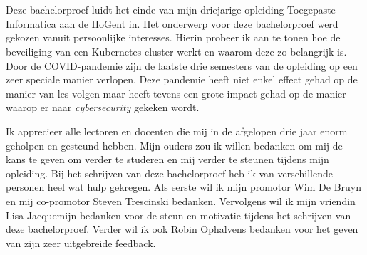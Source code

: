
\chapter*{}
\label{ch:voorwoord}


Deze bachelorproef luidt het einde van mijn driejarige opleiding Toegepaste Informatica aan de HoGent in. Het onderwerp voor deze bachelorproef werd gekozen vanuit persoonlijke interesses. Hierin probeer ik aan te tonen hoe de beveiliging van een Kubernetes cluster werkt en waarom deze zo belangrijk is. Door de COVID-pandemie zijn de laatste drie semesters van de opleiding op een zeer speciale manier verlopen. Deze pandemie heeft niet enkel effect gehad op de manier van les volgen maar heeft tevens een grote impact gehad op de manier waarop er naar \textit{cybersecurity} gekeken wordt. 

Ik apprecieer alle lectoren en docenten die mij in de afgelopen drie jaar enorm geholpen en gesteund hebben. Mijn ouders zou ik willen bedanken om mij de kans te geven om verder te studeren en mij verder te steunen tijdens mijn opleiding. Bij het schrijven van deze bachelorproef heb ik van verschillende personen heel wat hulp gekregen. Als eerste wil ik mijn promotor Wim De Bruyn en mij co-promotor Steven Trescinski bedanken. Vervolgens wil ik mijn vriendin Lisa Jacquemijn bedanken voor de steun en motivatie tijdens het schrijven van deze bachelorproef.  Verder wil ik ook Robin Ophalvens bedanken voor het geven van zijn zeer uitgebreide feedback.